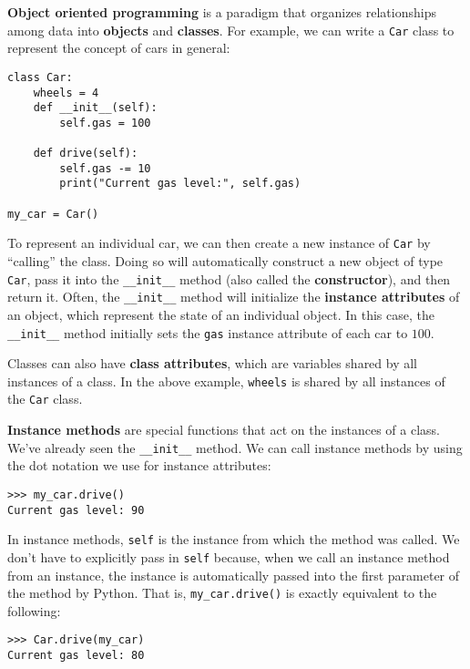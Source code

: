 \textbf{Object oriented programming} is a paradigm that organizes relationships among data into \textbf{objects} and \textbf{classes}. For example, we can write a \lstinline{Car} class to represent the concept of cars in general: 

\begin{lstlisting}
class Car:
    wheels = 4
    def __init__(self):
        self.gas = 100

    def drive(self):
        self.gas -= 10
        print("Current gas level:", self.gas)

my_car = Car()
\end{lstlisting}

To represent an individual car, we can then create a new instance of \lstinline{Car} by ``calling'' the class. Doing so will automatically construct a new object of type \lstinline{Car}, pass it into the \lstinline{__init__} method (also called the \textbf{constructor}), and then return it. Often, the \lstinline{__init__} method will initialize the \textbf{instance attributes} of an object, which represent the state of an individual object. In this case, the \lstinline{__init__} method initially sets the \lstinline{gas} instance attribute of each car to $100$. 

Classes can also have \textbf{class attributes}, which are variables shared by all instances of a class. In the above example, \lstinline{wheels} is shared by all instances of the \lstinline{Car} class. 

\textbf{Instance methods} are special functions that act on the instances of a class. We've already seen the \lstinline{__init__} method. We can call instance methods by using the dot notation we use for instance attributes: 
\begin{lstlisting}
>>> my_car.drive()
Current gas level: 90
\end{lstlisting}
In instance methods, \lstinline{self} is the instance from which the method was called.  We don’t have to explicitly pass in \lstinline{self} because, when we call an instance method from an instance, the instance is automatically passed into the first parameter of the method by Python. That is, \lstinline{my_car.drive()} is exactly equivalent to the following: 
\begin{lstlisting}
>>> Car.drive(my_car)
Current gas level: 80
\end{lstlisting}

